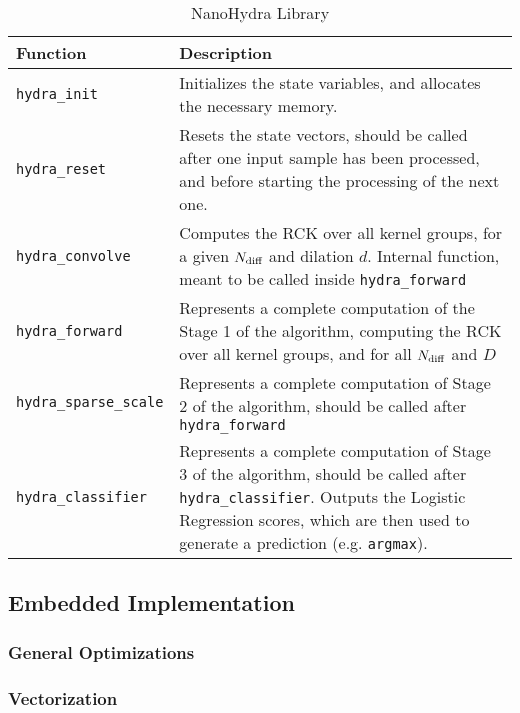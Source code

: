     \begin{table}[h!]
    \begin{tabular}{||p{1.5in}|p{4in}||}
        \hline
        Function & Description  \\

        \hline\hline
        \verb|hydra_init| & Initializes the state variables, and allocates the necessary memory. \\
        \hline
        \verb|hydra_reset| & Resets the state vectors, should be called after one input sample has been processed, and before starting the processing of the next one. \\
        \hline
        \verb|hydra_convolve|   & Computes the RCK over all kernel groups, for a given $N\sb{\text{diff}}$ and dilation $d$. Internal function, meant to be called inside \verb|hydra_forward|\\
        \hline
        \verb|hydra_forward|   & Represents a complete computation of the Stage 1 of the algorithm, computing the RCK over all kernel groups, and for all $N\sb{\text{diff}}$ and $D$\\
        \hline
        \verb|hydra_sparse_scale|   & Represents a complete computation of Stage 2 of the algorithm, should be called after \verb|hydra_forward|\\
        \hline
        \verb|hydra_classifier|     & Represents a complete computation of Stage 3 of the algorithm, should be called after \verb|hydra_classifier|. Outputs the Logistic Regression scores, which are then used to generate a prediction (e.g. \verb|argmax|).\\
        \hline
    \end{tabular}
    \caption{NanoHydra Library}
    \label{tbl:library_c}
    \end{table}

    \subsection{Embedded Implementation}\label{sec:im_nanohydra_embimp}

        \subsubsection{General Optimizations}\label{sec:im_nanohydra_embimp_genopt}


        \subsubsection{Vectorization}\label{sec:im_nanohydra_embimp_vect}

